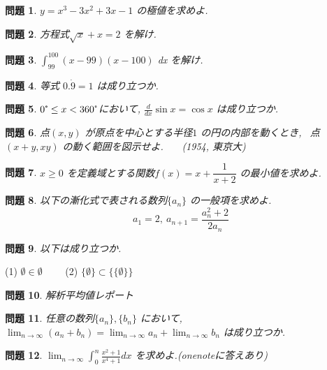 \documentclass[dvipdfmx]{jsarticle} %
\newtheorem{question}{問題}
\begin{document}
\begin{question}
  $y = x^3-3x^2+3x-1$ の極値を求めよ.
\end{question}

\begin{question}
  方程式$\sqrt{x} + x = 2$ を解け.
\end{question}

\begin{question}
  $\displaystyle \int_{99}^{100} (x-99)(x-100)$ dx を解け.
\end{question}

\begin{question}
  等式 $0.\dot{9} = 1$ は成り立つか.
\end{question}

\begin{question}
  $0\tcdegree \le x < 360\tcdegree$において, $\displaystyle \frac{d}{dx} \sin x = \cos x$ は成り立つか.
\end{question}

\begin{question}
  点$(x, y)$ が原点を中心とする半径$1$ の円の内部を動くとき, \ 点$(x+y, xy)$ の動く範囲を図示せよ. \ \ \ (1954, 東京大)
\end{question}

\begin{question}
  $x \ge 0$ を定義域とする関数$f(x) = x + \dfrac{1}{x+2}$ の最小値を求めよ.
\end{question}

\begin{question}
以下の漸化式で表される数列$\{a_n\}$ の一般項を求めよ.
$$
a_1=2, \ a_{n+1}=\frac{a_n^2+2}{2 a_n}
$$
\end{question}

\begin{question}
  以下は成り立つか.
\end{question}
  (1) $\emptyset \in \emptyset$ \ \ \ \ 
  (2) $\{\emptyset\} \subset \{\{\emptyset\}\}$

\begin{question}
  解析平均値レポート
\end{question}

\begin{question}
  任意の数列$\{a_n\}, \{b_n\}$ において, $\displaystyle \lim_{n \to \infty} (a_n + b_n) = \lim_{n \to \infty} a_n + \lim_{n \to \infty} b_n$ は成り立つか.
\end{question}

\begin{question}
  $\displaystyle \lim_{n \to \infty} \int_0^n \frac{x^2+1}{x^4+1} dx$ を求めよ.(onenoteに答えあり)
\end{question}
\end{document}
